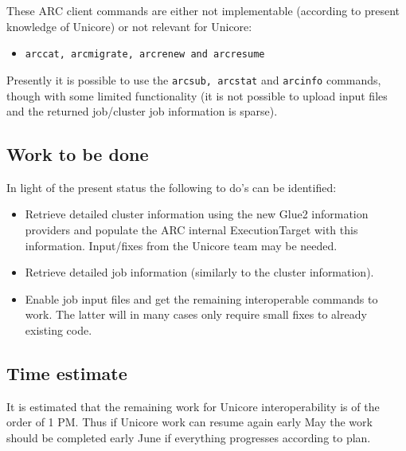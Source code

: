 \documentclass[11pt,oneside,a4paper,english]{article}
\begin{document}
These ARC client commands are either not implementable (according to present knowledge of Unicore) or not relevant for Unicore:
\begin{itemize}
\item{\texttt{arccat, arcmigrate, arcrenew and arcresume}}
\end{itemize}

Presently it is possible to use the \texttt{arcsub, arcstat} and \texttt{arcinfo} commands, though with some limited functionality (it is not possible to upload input files and the returned job/cluster job information is sparse). 

\subsection*{Work to be done}
In light of the present status the following to do's can be identified:

\begin{itemize}
\item{Retrieve detailed cluster information using the new Glue2 information providers and populate the ARC internal ExecutionTarget with this information. Input/fixes from the Unicore team may be needed.}
\item{Retrieve detailed job information (similarly to the cluster information).}
\item{Enable job input files and get the remaining interoperable commands to work. The latter will in many cases only require small fixes to already existing code.}
\end{itemize}
\subsection*{Time estimate}
It is estimated that the remaining work for Unicore interoperability is of the order of 1 PM. Thus if Unicore work can resume again early May the work should be completed early June if everything progresses according to plan.
\end{document}
